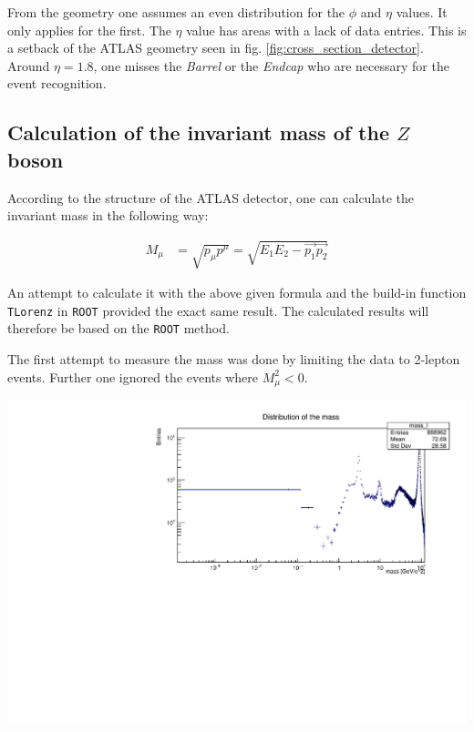 \documentclass[12pt, a4paper, bibliography=totoc]{scrartcl}
\begin{document}
\begin{multicols}{2}
\begin{center}
\end{center}
From the geometry one assumes an even distribution for the $\phi$ and $\eta$ values.
It only applies for the first. The $\eta$ value has areas with a lack of data entries. 
This is a setback of the ATLAS geometry seen in fig. \ref{fig:cross_section_detector}. 
Around $\eta = 1.8$, one misses the \textit{Barrel} or the \textit{Endcap} who are necessary for the event recognition. 

\subsection{Calculation of the invariant mass of the $Z$ boson}
According to the structure of the ATLAS detector, one can calculate the invariant mass in the following way:

\begin{align}
	M_{\mu} &= \sqrt{p_{\mu}p^{\mu}} = \sqrt{E_{1}E_{2}-\vec{p_{1}}\vec{p_{2}}}%
\end{align}


An attempt to calculate it with the above given formula and the build-in function \verb*+TLorenz+ in \verb*+ROOT+ provided the exact same result. 
The calculated results will therefore be based on the \verb*+ROOT+ method.


The first attempt to measure the mass was done by limiting the data to 2-lepton events. 
Further one ignored the events where $M_{\mu}^{2} < 0$. 
\begin{center}
	\includegraphics[width=\linewidth]{fig/mass_lz_log.pdf}
	\label{mass_lz_log}
\end{center}


\end{multicols}
\end{document}
